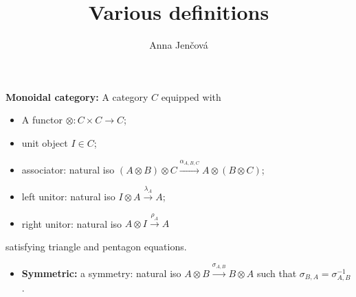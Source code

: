 \documentclass[12pt]{article}
\title{Various definitions}
\author{Anna Jen\v cov\'a}
\theoremstyle{definition}
\theoremstyle{remark}
\begin{document}
\maketitle


 \textbf{Monoidal category:} A category $C$ equipped with
\begin{itemize}
\item A functor $\otimes: C\times C\to C$;
\item unit object $I\in C$;
\item associator: natural iso $(A\otimes B)\otimes C \xrightarrow{\alpha_{A,B,C}} A\otimes
(B\otimes C)$;
\item left unitor: natural iso $I\otimes A \xrightarrow{\lambda_A} A$;


\item right unitor: natural iso $A\otimes I \xrightarrow{\rho_A} A$
\end{itemize}

satisfying triangle and pentagon equations.
\begin{itemize}
\item \textbf{Symmetric:} a symmetry: natural iso $A\otimes
B\xrightarrow{\sigma_{A,B}} B\otimes A$ such that $\sigma_{B,A}=\sigma_{A,B}^{-1}$.

\end{itemize}
\end{document}
